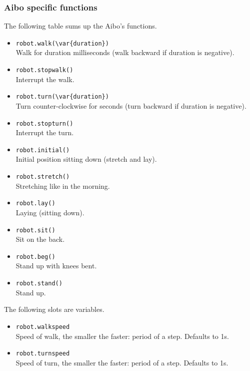 \subsubsection{Aibo specific functions}

The following table sums up the Aibo's functions.

\begin{itemize}
\item \lstinline|robot.walk(\var{duration})|\\
  Walk for duration milliseconds (walk backward if duration is negative).
\item \lstinline|robot.stopwalk()|\\
  Interrupt the walk.
\item \lstinline|robot.turn(\var{duration})|\\
  Turn counter-clockwise for  seconds (turn backward if
  duration is negative).
\item \lstinline|robot.stopturn()|\\
  Interrupt the turn.
\item \lstinline|robot.initial()|\\
  Initial position sitting down (stretch and lay).
\item \lstinline|robot.stretch()|\\
  Stretching like in the morning.
\item \lstinline|robot.lay()|\\
  Laying (sitting down).
\item \lstinline|robot.sit()|\\
  Sit on the back.
\item \lstinline|robot.beg()|\\
  Stand up with knees bent.
\item \lstinline|robot.stand()|\\
  Stand up.
\end{itemize}

The following slots are variables.
\begin{itemize}
\item \lstinline|robot.walkspeed|\\
  Speed of walk, the smaller the faster: period of a step. Defaults to
  1s.
\item \lstinline|robot.turnspeed|\\
  Speed of turn, the smaller the faster: period of a step. Defaults to
  1s.
\end{itemize}


